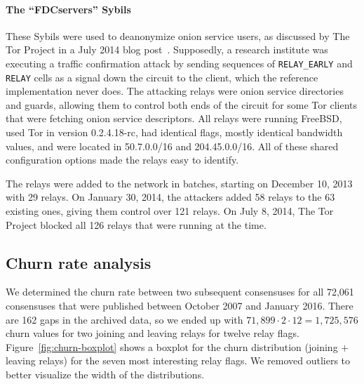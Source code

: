\paragraph{The ``FDCservers'' Sybils}
These Sybils were used to deanonymize onion service users, as discussed by The
Tor Project in a July 2014 blog post~\cite{cmucert}.  Supposedly, a research
institute was executing a traffic confirmation attack by sending sequences of
\texttt{RELAY\_EARLY} and \texttt{RELAY} cells as a signal down the circuit to
the client, which the reference implementation never does.  The attacking relays
were onion service directories and guards, allowing them to control both ends of
the circuit for some Tor clients that were fetching onion service descriptors.
All relays were running FreeBSD, used Tor in version 0.2.4.18-rc, had identical
flags, mostly identical bandwidth values, and were located in 50.7.0.0/16 and
204.45.0.0/16.  All of these shared configuration options made the relays easy
to identify.

The relays were added to the network in batches, starting on December 10, 2013
with 29 relays.  On January 30, 2014, the attackers added 58 relays to the 63
existing ones, giving them control over 121 relays.  On July 8, 2014, The Tor
Project blocked all 126 relays that were running at the time.

% 

\subsection{Churn rate analysis}
\label{sec:churn}
We determined the churn rate between two subsequent consensuses for all 72,061
consensuses that were published between October 2007 and January 2016.  There
are 162 gaps in the archived data, so we ended up with $71,899 \cdot 2 \cdot 12
= 1,725,576$ churn values for two joining and leaving relays for twelve relay
flags.  Figure~\ref{fig:churn-boxplot} shows a boxplot for the churn
distribution (joining $+$ leaving relays) for the seven most interesting relay
flags.  We removed outliers to better visualize the width of the distributions.

